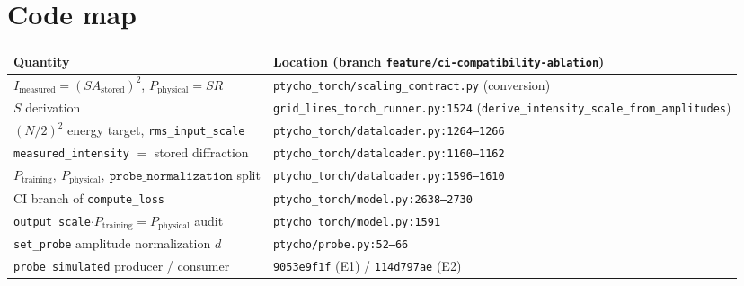 \documentclass[11pt]{article}
\newcommand{\Astored}{A_{\mathrm{stored}}}
\newcommand{\Imeas}{I_{\mathrm{measured}}}
\newcommand{\Pphys}{P_{\mathrm{physical}}}
\newcommand{\Ptrain}{P_{\mathrm{training}}}
\newcommand{\code}[1]{\texttt{#1}}
\begin{document}
\appendix
\section{Code map}
\begin{center}
\begin{tabular}{ll}
\toprule
Quantity & Location (branch \code{feature/ci-compatibility-ablation}) \\
\midrule
$\Imeas = (S\Astored)^2$, $\Pphys = SR$ & \code{ptycho\_torch/scaling\_contract.py} (conversion) \\
$S$ derivation & \code{grid\_lines\_torch\_runner.py:1524} (\code{derive\_intensity\_scale\_from\_amplitudes}) \\
$(N/2)^2$ energy target, \code{rms\_input\_scale} & \code{ptycho\_torch/dataloader.py:1264--1266} \\
\code{measured\_intensity} $=$ stored diffraction & \code{ptycho\_torch/dataloader.py:1160--1162} \\
$\Ptrain,\ \Pphys,\ \code{probe\_normalization}$ split & \code{ptycho\_torch/dataloader.py:1596--1610} \\
CI branch of \code{compute\_loss} & \code{ptycho\_torch/model.py:2638--2730} \\
\code{output\_scale}$\cdot\Ptrain = \Pphys$ audit & \code{ptycho\_torch/model.py:1591} \\
\code{set\_probe} amplitude normalization $d$ & \code{ptycho/probe.py:52--66} \\
\code{probe\_simulated} producer / consumer & \code{9053e9f1f} (E1) / \code{114d797ae} (E2) \\
\bottomrule
\end{tabular}
\end{center}
\end{document}
